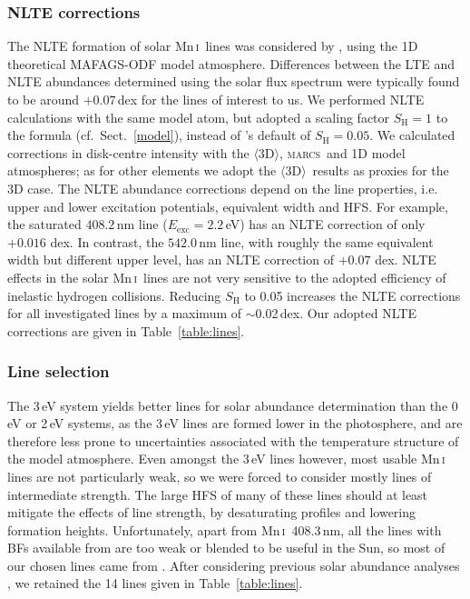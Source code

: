 \documentclass[traditabstract]{aa}
\newcommand{\oneDAV}{$\langle\mathrm{3D}\rangle$}
\newcommand{\marcs}{\textsc{marcs}}
\newcommand{\altmni}{Mn\,\textsc{i}}
\newcommand{\mni}{\altmni\ }
\begin{document}
\subsubsection{NLTE corrections}
\label{MnNLTE}
The NLTE formation of solar \mni lines was considered by \citet{Bergemann07}, using the 1D theoretical MAFAGS-ODF model atmosphere. Differences between the LTE and NLTE abundances determined using the solar flux spectrum were typically found to be around $+0.07$\,dex for the lines of interest to us.  We performed NLTE calculations with the same model atom, but adopted a scaling factor $S_\mathrm{H}=1$ to the \citet{Drawin69} formula (cf.\ Sect.\ \ref{model}), instead of \citeauthor{Bergemann07}'s default of $S_\mathrm{H}=0.05$. We calculated corrections in disk-centre intensity with the \oneDAV , \marcs\ and  1D model atmospheres; as for other elements we adopt the \oneDAV\ results as proxies for the 3D case. The NLTE abundance corrections depend on the line properties, i.e. upper and lower excitation potentials, equivalent width and HFS. For example, the saturated $408.2$\,nm line ($E_\mathrm{exc}=2.2$\,eV) has an NLTE correction of only $+0.016$ dex. In contrast, the $542.0$\,nm line, with roughly the same equivalent width but
different upper level, has an NLTE correction of
$+0.07$ dex.  NLTE effects in the solar \mni lines are not very sensitive to the adopted efficiency of inelastic hydrogen collisions.
Reducing $S_\mathrm{H}$  to 0.05 increases the NLTE corrections for all investigated lines by a maximum of $\sim$0.02\,dex. Our adopted NLTE corrections are given in Table~\ref{table:lines}.

\subsubsection{Line selection}
\label{Mnlineselection}

The \mbox{3\,eV} system yields better lines for solar abundance determination than the \mbox{0\,eV} or \mbox{2\,eV} systems, as the \mbox{3\,eV} lines are formed lower in the photosphere, and are therefore less prone to uncertainties associated with the temperature structure of the model atmosphere.  Even amongst the \mbox{3\,eV} lines however, most usable Mn\,\textsc{i} lines are not particularly weak, so we were forced to consider mostly lines of intermediate strength.  The large HFS of many of these lines should at least mitigate the effects of line strength, by desaturating profiles and lowering formation heights.  Unfortunately, apart from \mni 408.3\,nm, all the lines with BFs available from \citet{BW05b} are too weak or blended to be useful in the Sun, so most of our chosen lines came from \citet{BW07}.  After considering previous solar abundance analyses \citep[e.g.][]{Blackwell72a, Biemont75a, Booth84b, BW07, Bergemann07}, we retained the 14 lines given in
Table~\ref{table:lines}.
\end{document}
